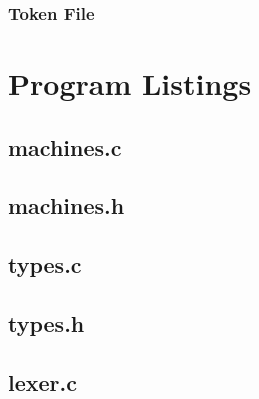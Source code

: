 \documentclass[titlepage]{article}
\begin{document}
		\subsubsection{Token File}
		
	\section{Program Listings}
		\subsection{machines.c}
		
		\subsection{machines.h}
		
		\subsection{types.c}
		
		\subsection{types.h}
		
		\subsection{lexer.c}
		
\end{document}
